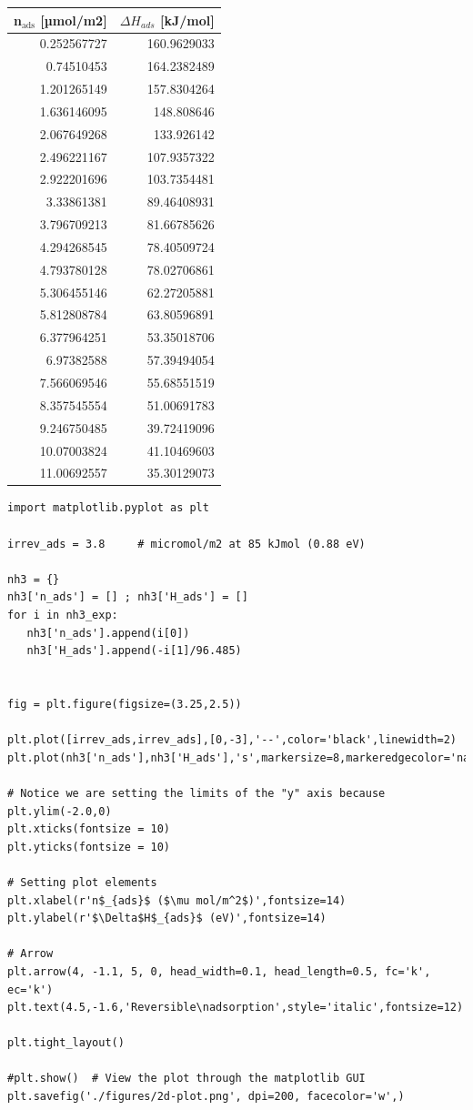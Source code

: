 \documentclass[11pt]{article}
\begin{document}
\begin{center}
\label{tab:org116baf1}
\begin{tabular}{rr}
n\(_{\text{ads}}\) [µmol/m2] & \(\Delta H_{ads}\)  [kJ/mol]\\
\hline
0.252567727 & 160.9629033\\
0.74510453 & 164.2382489\\
1.201265149 & 157.8304264\\
1.636146095 & 148.808646\\
2.067649268 & 133.926142\\
2.496221167 & 107.9357322\\
2.922201696 & 103.7354481\\
3.33861381 & 89.46408931\\
3.796709213 & 81.66785626\\
4.294268545 & 78.40509724\\
4.793780128 & 78.02706861\\
5.306455146 & 62.27205881\\
5.812808784 & 63.80596891\\
6.377964251 & 53.35018706\\
6.97382588 & 57.39494054\\
7.566069546 & 55.68551519\\
8.357545554 & 51.00691783\\
9.246750485 & 39.72419096\\
10.07003824 & 41.10469603\\
11.00692557 & 35.30129073\\
\end{tabular}
\end{center}


\begin{verbatim}
import matplotlib.pyplot as plt

irrev_ads = 3.8     # micromol/m2 at 85 kJmol (0.88 eV)

nh3 = {}
nh3['n_ads'] = [] ; nh3['H_ads'] = []
for i in nh3_exp:
   nh3['n_ads'].append(i[0])
   nh3['H_ads'].append(-i[1]/96.485) 


fig = plt.figure(figsize=(3.25,2.5))

plt.plot([irrev_ads,irrev_ads],[0,-3],'--',color='black',linewidth=2)
plt.plot(nh3['n_ads'],nh3['H_ads'],'s',markersize=8,markeredgecolor='navy',markerfacecolor='paleturquoise',markeredgewidth=1.5)

# Notice we are setting the limits of the "y" axis because
plt.ylim(-2.0,0)
plt.xticks(fontsize = 10)
plt.yticks(fontsize = 10)

# Setting plot elements
plt.xlabel(r'n$_{ads}$ ($\mu mol/m^2$)',fontsize=14)
plt.ylabel(r'$\Delta$H$_{ads}$ (eV)',fontsize=14)

# Arrow
plt.arrow(4, -1.1, 5, 0, head_width=0.1, head_length=0.5, fc='k', ec='k')
plt.text(4.5,-1.6,'Reversible\nadsorption',style='italic',fontsize=12)

plt.tight_layout()

#plt.show()  # View the plot through the matplotlib GUI
plt.savefig('./figures/2d-plot.png', dpi=200, facecolor='w',)
\end{verbatim}
\end{document}

